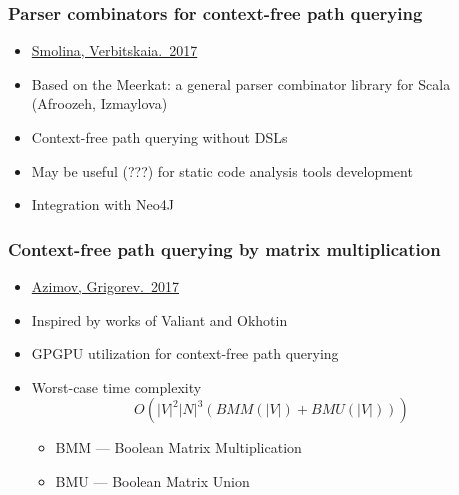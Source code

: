 \documentclass[xcolor=table]{beamer}
\begin{document}
\begin{frame}
  \transwipe[direction=90]
  \frametitle{Parser combinators for context-free path querying}
  \begin{itemize}
    \item \href{http://plc.sfedu.ru/files/PLC-2017-proceedings.pdf\#page=233}{Smolina, Verbitskaia.~2017}
    \item Based on the Meerkat: a general parser combinator library for Scala (Afroozeh, Izmaylova)
    \item Context-free path querying without DSLs
    \item May be useful (???) for static code analysis tools development
    \item Integration with Neo4J
  \end{itemize}
\end{frame}

\begin{frame}
  \transwipe[direction=90]
  \frametitle{Context-free path querying by matrix multiplication}
  \begin{itemize}
    \item \href{https://arxiv.org/abs/1707.01007}{Azimov, Grigorev.~2017}
    \item Inspired by works of Valiant and Okhotin    
    \item GPGPU utilization for context-free path querying
    \item Worst-case time complexity $$O(|V|^2 |N|^3 (BMM(|V|) + BMU(|V|)))$$
    \begin{itemize}
      \item BMM --- Boolean Matrix Multiplication
      \item BMU --- Boolean Matrix Union
    \end{itemize}

  \end{itemize}
\end{frame}
\end{document}
